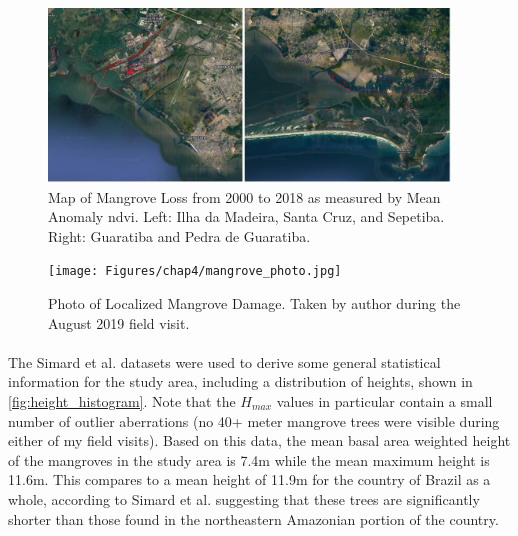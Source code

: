 \begin{figure}[H] 
\centering
\includegraphics[width=0.95\textwidth]{Figures/chap4/loss_map.png}
\caption[Map of Mangrove Loss]{Map of Mangrove Loss from 2000 to 2018 as measured by Mean Anomaly \ac{ndvi}. Left: Ilha da Madeira, Santa Cruz, and Sepetiba. Right: Guaratiba and Pedra de Guaratiba.}
\label{fig:loss_map}
\end{figure}

\begin{figure}[H] 
\centering
\texttt{[image: Figures/chap4/mangrove\_photo.jpg]}
\caption[Photo of Localized Mangrove Damage]{Photo of Localized Mangrove Damage. Taken by author during the August 2019 field visit.}
\label{fig:mangrove_photo}
\end{figure}


\paragraph{} \leavevmode\newline

The Simard et al. datasets were used to derive some general statistical information for the study area, including a distribution of heights, shown in \ref{fig:height_histogram}. Note that the $H_{max}$ values in particular contain a small number of outlier aberrations (no 40+ meter mangrove trees were visible during either of my field visits). Based on this data, the mean basal area weighted height of the mangroves in the study area is 7.4m while the mean maximum height is 11.6m. This compares to a mean height of 11.9m for the country of Brazil as a whole, according to Simard et al. \cite{simardMangroveCanopyHeight2019} suggesting that these trees are significantly shorter than those found in the northeastern Amazonian portion of the country.

